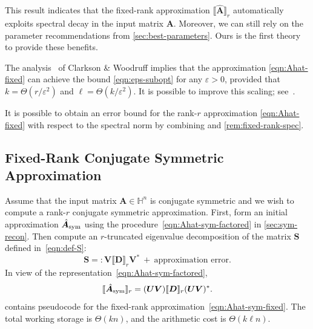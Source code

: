 \documentclass[final]{siamart1116}
\numberwithin{equation}{section}
\numberwithin{theorem}{section}
\numberwithin{figure}{section}
\newcommand{\eps}{\varepsilon}
\newcommand{\mtx}[1]{\bm{#1}}
\newcommand{\lowrank}[2]{\llbracket {#1} \rrbracket_{#2}}
\begin{document}
This result indicates that the fixed-rank approximation $\lowrank{\hat{\mtx{A}}}{r}$
automatically exploits spectral decay in the input matrix $\mtx{A}$.  Moreover,
we can still rely on the parameter recommendations from \cref{sec:best-parameters}.
Ours is the first theory to provide these benefits.

\begin{remark} \label{rem:fixed-rank-prior}
The analysis~\cite[Thm.~4.8]{CW09:Numerical-Linear} of Clarkson \& Woodruff
implies that the approximation \cref{eqn:Ahat-fixed}
can achieve the bound \cref{eqn:eps-subopt} for any $\eps > 0$,
provided that $k = \Theta(r/\eps^2)$ and $\ell = \Theta(k/\eps^2)$.
It is possible to improve this scaling; see~\cite[Thm.~5.1]{TYUC17:Randomized-Single-View-TR}.
\end{remark}

\begin{remark}
It is possible to obtain an error bound for the rank-$r$ approximation \cref{eqn:Ahat-fixed}
with respect to the spectral norm by combining \cite[Thm.~4.2]{TYUC17:Randomized-Single-View-TR}
and \cref{rem:fixed-rank-spec}.
\end{remark}
























\subsection{Fixed-Rank Conjugate Symmetric Approximation}

Assume that the input matrix $\mtx{A} \in \mathbb{H}^n$ is conjugate symmetric
and we wish to compute a rank-$r$ conjugate symmetric approximation.
First, form an initial approximation $\hat{\mtx{A}}_{\rm sym}$ using
the procedure~\cref{eqn:Ahat-sym-factored} in \cref{sec:sym-recon}.
Then compute an $r$-truncated eigenvalue decomposition of the matrix $\mtx{S}$
defined in~\cref{eqn:def-S}:
$$
\mtx{S} =: \mtx{V} \lowrank{\mtx{D}}{r} \mtx{V}^* \ +\ \textrm{approximation error}.
$$
In view of the representation~\cref{eqn:Ahat-sym-factored},
\begin{equation} \label{eqn:Ahat-sym-fixed}
\lowrank{\hat{\mtx{A}}_{\rm sym}}{r} = (\mtx{UV}) \lowrank{\mtx{D}}{r} (\mtx{UV})^*.
\end{equation}
 contains pseudocode for the
fixed-rank approximation~\cref{eqn:Ahat-sym-fixed}.
The total working storage is $\Theta(k n)$,
and the arithmetic cost is $\Theta(k \ell n)$.
\end{document}
